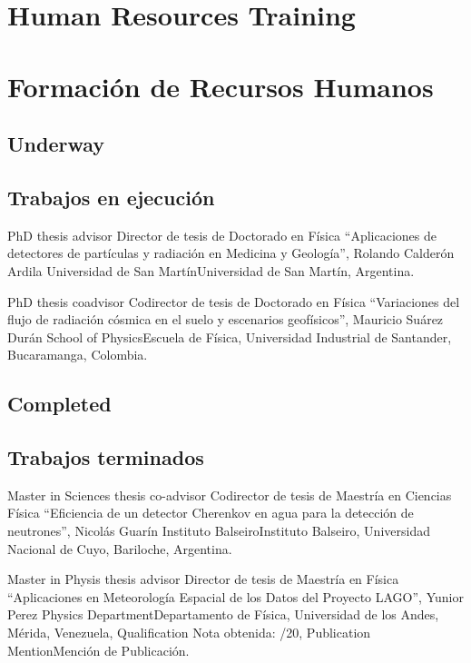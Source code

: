 \ifeng
\section*{Human Resources Training}
\else
\section*{Formación de Recursos Humanos}
\fi


\ifeng
	\subsection*{Underway}
\else
	\subsection*{Trabajos en ejecución}
\fi

\ifeng
PhD thesis advisor
 \else
Director de tesis de Doctorado en Física
 \fi
``Aplicaciones de detectores de partículas y radiación en Medicina y Geología'', Rolando Calderón Ardila \at \ifeng Universidad de San Martín\else Universidad de San Martín\fi, Argentina.

\ifeng
PhD thesis coadvisor
 \else
Codirector de tesis de Doctorado en Física
 \fi
``Variaciones del flujo de radiación cósmica en el suelo y escenarios geofísicos'', Mauricio Suárez Durán \at \ifeng School of Physics\else Escuela de Física\fi, Universidad Industrial de Santander, Bucaramanga, Colombia.

\ifeng
\subsection*{Completed}
\else
\subsection*{Trabajos terminados}
\fi

\ifeng
Master in Sciences thesis co-advisor
 \else
Codirector de tesis de Maestría en Ciencias Física
 \fi
``Eficiencia de un detector Cherenkov en agua para la detección de neutrones'', Nicolás Guarín \at \ifeng Instituto Balseiro\else Instituto Balseiro\fi, Universidad Nacional de Cuyo, Bariloche, Argentina.


\ifeng
Master in Physis thesis advisor
 \else
Director de tesis de Maestría en Física
 \fi
 ``Aplicaciones en Meteorología Espacial de los Datos del Proyecto LAGO'', Yunior Perez \at \ifeng Physics Department\else Departamento de Física\fi, Universidad de los Andes, Mérida, Venezuela, \ifeng Qualification \else Nota obtenida: /20, \ifeng Publication Mention\else Mención de Publicación\fi.

